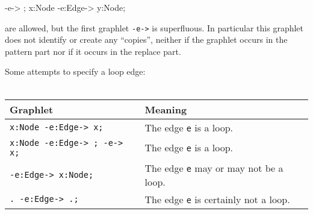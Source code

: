 \begin{grgenlet}
-e-> ;
x:Node -e:Edge-> y:Node;
\end{grgenlet}
are allowed, but the first graphlet \texttt{-e->} is superfluous. In particular this graphlet does not identify or create any ``copies'', neither if the graphlet occurs in the pattern part nor if it occurs in the replace part.
\begin{example}
Some attempts to specify a loop edge:\\
\mbox{ }\\
\begin{tabular}[c]{ll} 
 \textbf{Graphlet} & \textbf{Meaning} \\ \hline
 \texttt{x:Node -e:Edge-> x;} & The edge \texttt{e} is a loop.\\ 
 \texttt{x:Node -e:Edge-> ; -e-> x;} & The edge \texttt{e} is a loop.\\ 
 \texttt{-e:Edge-> x:Node;} & The edge \texttt{e} may or may not be a loop.\\ 
 \texttt{.\ -e:Edge-> .;} & The edge \texttt{e} is certainly not a loop.\\ 
\end{tabular}
\end{example}

